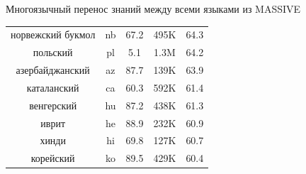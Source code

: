 \begin{frame}{Многоязычный перенос знаний между всеми языками из MASSIVE}
\begin{minipage}{0.5\textwidth}
\begin{table}[htbp]
{{\begin{tabular}[baseline={(0,2.1)}]{|c|c|c|c|c|}
норвежский букмол & nb & 67.2 & 495K & 64.3 \\
польский & pl & 5.1 & 1.3M & 64.2 \\
азербайджанский & az & 87.7 & 139K & 63.9 \\
каталанский & ca & 60.3 & 592K & 61.4 \\
венгерский & hu & 87.2 & 438K & 61.3 \\
иврит & he & 88.9 & 232K & 60.9 \\
хинди & hi & 69.8 & 127K & 60.7 \\
корейский & ko & 89.5 & 429K & 60.4 \\
\hline
\end{tabular}
}
}
\end{table}
\end{minipage}
\end{frame}

